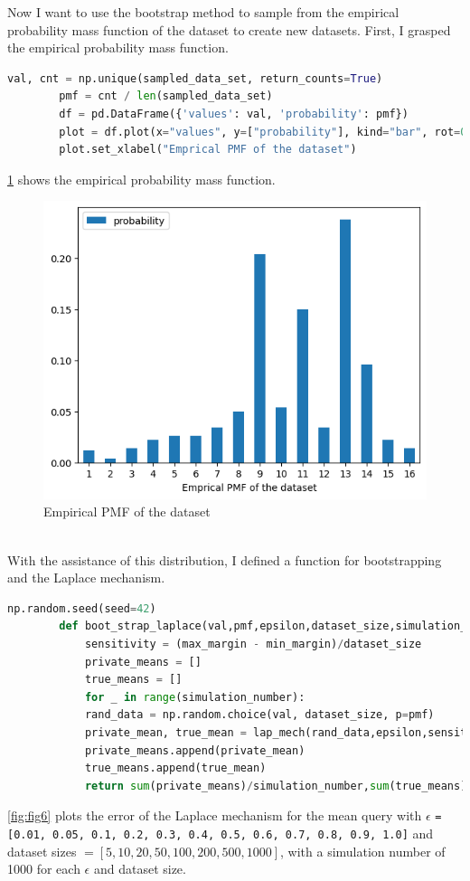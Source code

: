 \documentclass[12pt]{extarticle}
\begin{document}
	Now I want to use the bootstrap method to sample from the empirical probability mass function of the dataset to create new datasets. First, I grasped the empirical probability mass function.
	\begin{lstlisting}[language=Python]	
		val, cnt = np.unique(sampled_data_set, return_counts=True)
		pmf = cnt / len(sampled_data_set)
		df = pd.DataFrame({'values': val, 'probability': pmf})
		plot = df.plot(x="values", y=["probability"], kind="bar", rot=0)
		plot.set_xlabel("Emprical PMF of the dataset")
	\end{lstlisting}
	 \ref{fig:fig5} shows the empirical probability mass function.
	 \begin{figure}[h]
	 	\centering
	 	\includegraphics[width=1\textwidth]{im5.png}
	 	\caption{Empirical PMF of the dataset}
	 	\label{fig:fig5}
	 \end{figure}\\
	With the assistance of this distribution, I defined a function for bootstrapping and the Laplace mechanism.
	\begin{lstlisting}[language=Python]
		np.random.seed(seed=42)
		def boot_strap_laplace(val,pmf,epsilon,dataset_size,simulation_number,min_margin=0,max_margin=20) :
			sensitivity = (max_margin - min_margin)/dataset_size
			private_means = []
			true_means = []
			for _ in range(simulation_number):
			rand_data = np.random.choice(val, dataset_size, p=pmf)
			private_mean, true_mean = lap_mech(rand_data,epsilon,sensitivity,min_margin,max_margin)
			private_means.append(private_mean)
			true_means.append(true_mean)
			return sum(private_means)/simulation_number,sum(true_means)/simulation_number
	\end{lstlisting}
	\ref{fig:fig6} plots the error of the Laplace mechanism for the mean query with $\epsilon$ \texttt{= [0.01, 0.05, 0.1, 0.2, 0.3, 0.4, 0.5, 0.6, 0.7, 0.8, 0.9, 1.0]} and dataset sizes $=[5, 10, 20, 50, 100, 200, 500, 1000]$, with a simulation number of 1000 for each $\epsilon$ and dataset size.
\end{document}
